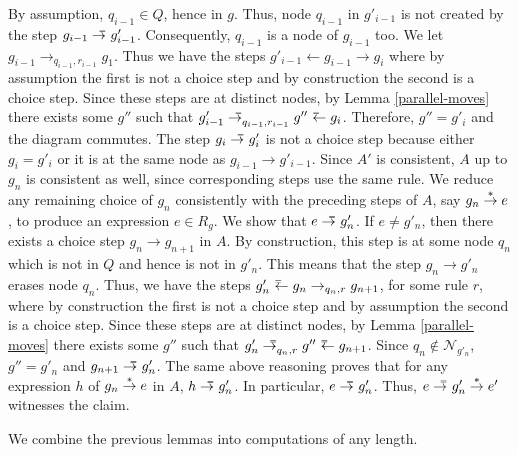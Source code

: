 \documentclass{mytlp}
\newcommand{\inparen}[1]{\mbox{\rm (}#1\mbox{\rm )}}
\newcommand{\modulo}{\inparen{modulo a renaming of nodes}}
\newcommand{\nodes}{\ensuremath{\mathcal{N}}}
\newtheorem{corollary}{Corollary}
\newcommand{\myproof}[1]{
  \ifx\showproof\undefined
\else
\mbox{\it Proof\ \ } #1 ~~$\Box$ \\[2ex]
  \fi
}
\def\showproof{}
\newcommand{\tostar}{\buildrel * \over \to}
\newcommand{\toxi}{
  \mbox{$\rlap{\raisebox{.15ex}[0pt][0pt]{\kern.95ex\tiny$\Xi$}}\to\,$}
}
\newcommand{\toxistar}{\mbox{$\,\buildrel * \over \toxi\,$}}
\newcommand{\toequal}{\to^{\llap{\raisebox{.3ex}{\tiny $=$}}}}
\newcommand{\leftequal}{{}^{\rlap{\ \raisebox{.3ex}{\tiny $=$}}}\leftarrow}
\newcommand{\rep}{R}
\begin{document}
{{By assumption, $q_{i-1} \in Q$, hence in $g$.
Thus, node $q_{i-1}$ in $g'_{i-1}$ is not created
by the step $g_{i-1} \toequal g'_{i-1}$.
Consequently, $q_{i-1}$ is a node of $g_{i-1}$ too.
We let $g_{i-1} \to_{q_{i-1},r_{i-1}} g_1$.
Thus we have the steps $g'_{i-1} \leftarrow g_{i-1} \to g_i$
where by assumption the first is not a choice step and
by construction the second is a choice step.
Since these steps are at distinct nodes, by
Lemma \ref{parallel-moves} there exists some $g''$ such that
$g'_{i-1} \toequal_{q_{i-1},r_{i-1}} g'' \leftequal g_i$.
Therefore, $g''=g'_i$ and the diagram commutes.
The step $g_i \toequal g'_i$ is not a choice step because either
$g_i = g'_i$ or it is at the same node as $g_{i-1} \to g'_{i-1}$.
Since $A'$ is consistent, $A$ up to $g_n$ is consistent as well,
since corresponding steps use the same rule.
We reduce any remaining choice of $g_n$ consistently with
the preceding steps of $A$, say $g_n \tostar e$,
to produce an expression $e \in \rep_{g}$.
We show that $e \toequal g'_n$.
If $e \ne g'_n$, then there exists
a choice step $g_n \to g_{n+1}$ in $A$.
By construction, this step is at some node $q_n$ which is not in $Q$
and hence is not in $g'_n$.
This means that the step $g_n \to g'_n$ erases node $q_n$.
Thus, we have the steps $g'_n \leftequal g_n \to_{q_n,r} g_{n+1}$,
for some rule  $r$, where by construction the first is not a choice step
and by assumption the second is a choice step. 
Since these steps are at distinct nodes, by
Lemma \ref{parallel-moves} there exists some $g''$ such that
$g'_n \toequal_{q_n,r} g'' \leftequal g_{n+1}$.
Since $q_n \not\in \nodes_{g'_n}$, $g''=g'_n$
and $g_{n+1} \toequal g'_n$.
The same above reasoning proves that for any expression $h$ of
$g_n \tostar e$ in $A$, $h \toequal g'_n$.
In particular, $e \toequal g'_n$.
Thus, $e \toequal g'_n \tostar e'$ witnesses the claim.
}
}

\lemmainvarnonchoice
We combine the previous lemmas
into computations of any length.

\def\corollsequence{
\begin{corollary}
\label{pre-correctness}
If $g \toxistar g'$ with no choice steps, then 
\emph{(1)}~ for any expression $e \in \rep_g$,
there exists an expression $e' \in \rep_{g'}$
such that $e \tostar e'$ \modulo{}, and
\emph{(2)}~ for any expression $e' \in \rep_{g'}$, 
there exists an expression $e \in \rep_g$ 
such that $e \tostar e'$ \modulo{}.
\end{corollary}
\myproof{
Both claims are proved by a trivial
induction on the number of steps of $g \toxistar g'$
using Lemmas~\ref{invariance-by-pull-tab} and
\ref{invariance-by-non-choice}.
}
}
\end{document}
